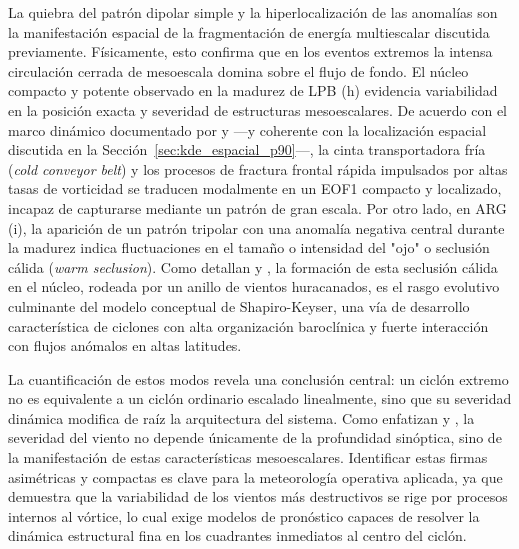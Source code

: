 La quiebra del patrón dipolar simple y la hiperlocalización de las anomalías son la manifestación espacial de la fragmentación de energía multiescalar discutida previamente. Físicamente, esto confirma que en los eventos extremos la intensa circulación cerrada de mesoescala domina sobre el flujo de fondo. El núcleo compacto y potente observado en la madurez de LPB (h) evidencia variabilidad en la posición exacta y severidad de estructuras mesoescalares. De acuerdo con el marco dinámico documentado por \citet{clark2005sting} y \citet{han2025system} —y coherente con la localización espacial discutida en la Sección~\ref{sec:kde_espacial_p90}—, la cinta transportadora fría (\textit{cold conveyor belt}) y los procesos de fractura frontal rápida impulsados por altas tasas de vorticidad se traducen modalmente en un EOF1 compacto y localizado, incapaz de capturarse mediante un patrón de gran escala. Por otro lado, en ARG (i), la aparición de un patrón tripolar con una anomalía negativa central durante la madurez indica fluctuaciones en el tamaño o intensidad del "ojo" o seclusión cálida (\textit{warm seclusion}). Como detallan \citet{schultz2021antecedents} y \citet{reboita2022from}, la formación de esta seclusión cálida en el núcleo, rodeada por un anillo de vientos huracanados, es el rasgo evolutivo culminante del modelo conceptual de Shapiro-Keyser, una vía de desarrollo característica de ciclones con alta organización baroclínica y fuerte interacción con flujos anómalos en altas latitudes.

La cuantificación de estos modos revela una conclusión central: un ciclón extremo no es equivalente a un ciclón ordinario escalado linealmente, sino que su severidad dinámica modifica de raíz la arquitectura del sistema. Como enfatizan \citet{corner2025classification} y \citet{eisenstein2023identification}, la severidad del viento no depende únicamente de la profundidad sinóptica, sino de la manifestación de estas características mesoescalares. Identificar estas firmas asimétricas y compactas es clave para la meteorología operativa aplicada, ya que demuestra que la variabilidad de los vientos más destructivos se rige por procesos internos al vórtice, lo cual exige modelos de pronóstico capaces de resolver la dinámica estructural fina en los cuadrantes inmediatos al centro del ciclón.

